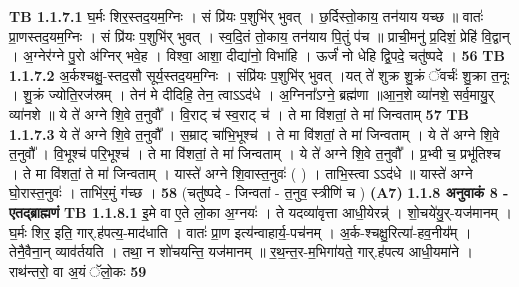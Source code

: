 \documentclass[17pt]{extarticle}
\begin{document}
                                \textbf{ TB 1.1.7.1} \newline
                  घ॒र्मः शिर॒स्तद॒यम॒ग्निः । सं प्रि॑यः प॒शुभि॑र् भुवत् । छ॒र्दिस्तो॒काय॒ तन॑याय यच्छ ॥ वातः॑ प्रा॒णस्तद॒यम॒ग्निः । सं प्रि॑यः प॒शुभि॑र् भुवत् । स्व॒दि॒तं तो॒काय॒ तन॑याय पि॒तुं प॑च ॥ प्राची॒मनु॑ प्र॒दिशं॒ प्रेहि॑ वि॒द्वान् । अ॒ग्नेर॑ग्ने पु॒रो अ॑ग्निर् भवे॒ह । विश्वा॒ आशा॒ दीद्या॑नो॒ विभा॑हि । ऊर्जं॑ नो धेहि द्वि॒पदे॒ चतु॑ष्पदे । \textbf{ 56} \newline
                  \newline
                                \textbf{ TB 1.1.7.2} \newline
                  अ॒र्कश्चक्षु॒-स्तद॒सौ सूर्य॒स्तद॒यम॒ग्निः । संप्रि॑यः प॒शुभि॑र् भुवत् ।यत् ते॑ शुक्र शु॒क्रं ॅवर्चः॑ शु॒क्रा त॒नूः । शु॒क्रं ज्योति॒रज॑स्रम् । तेन॑ मे दीदिहि॒ तेन॒ त्वाऽऽद॑धे । अ॒ग्निना᳚ऽग्ने॒ ब्रह्म॑णा ॥आ॒न॒शे व्या॑नशे॒ सर्व॒मायु॒र् व्या॑नशे ॥ ये ते॑ अग्ने शि॒वे त॒नुवौ᳚ । वि॒राट् च॑ स्व॒राट् च॑ । ते मा वि॑शतां॒ ते मा॑ जिन्वताम् \textbf{ 57} \newline
                  \newline
                                \textbf{ TB 1.1.7.3} \newline
                  ये ते॑ अग्ने शि॒वे त॒नुवौ᳚ । स॒म्राट् चा॑भि॒भूश्च॑ । ते मा वि॑शतां॒ ते मा॑ जिन्वताम् । ये ते॑ अग्ने शि॒वे त॒नुवौ᳚ । वि॒भूश्च॑ परि॒भूश्च॑ । ते मा वि॑शतां॒ ते मा॑ जिन्वताम् । ये ते॑ अग्ने शि॒वे त॒नुवौ᳚ । प्र॒भ्वी च॒ प्रभू॑तिश्च । ते मा वि॑शतां॒ ते मा॑ जिन्वताम् । यास्ते॑ अग्ने शि॒वास्त॒नुवः॑ ( ) । ताभि॒स्त्वा ऽऽद॑धे ॥ यास्ते॑ अग्ने घो॒रास्त॒नुवः॑ । ताभि॑र॒मुं ग॑च्छ । \textbf{ 58} \newline
                  \newline
                                    (चतु॑ष्पदे - जिन्वतां - त॒नुव॒ स्त्रीणि॑ च ) \textbf{(A7)} \newline \newline
                \textbf{ 1.1.8     अनुवाकं   8 - एतद्ब्राह्मणं} \newline
                                \textbf{ TB 1.1.8.1} \newline
                  इ॒मे वा ए॒ते लो॒का अ॒ग्नयः॑ । ते यदव्या॑वृत्ता आधी॒येरन्न्॑ । शो॒चये॑यु॒र्-यज॑मानम् । घ॒र्मः शिर॒ इति॒ गार्.ह॑पत्य॒-माद॑धाति । वातः॑ प्रा॒ण इत्य॑न्वाहार्य॒-पच॑नम् । अ॒र्क-श्चक्षु॒रित्या॑-हव॒नीय᳚म् । तेनै॒वैना॒न् व्याव॑र्तयति । तथा॒ न शो॑चयन्ति॒ यज॑मानम् ॥ र॒थ॒न्त॒र-म॒भिगा॑यते॒ गार्.ह॑पत्य आधी॒यमा॑ने । राथ॑न्तरो॒ वा अ॒यं ॅलो॒कः \textbf{ 59} \newline
                  \newline
\end{document}
